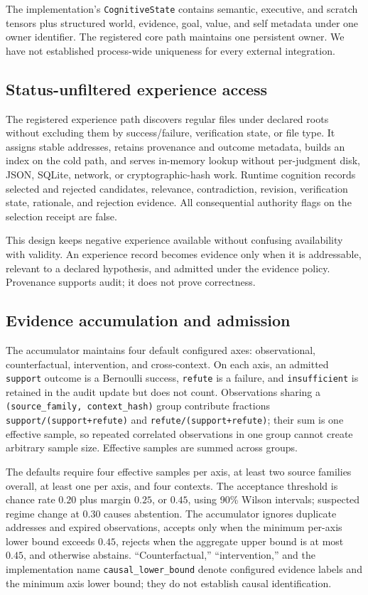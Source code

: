 \documentclass[10pt]{article}
\newcommand{\code}[1]{\texttt{#1}}
\begin{document}
The implementation's \code{CognitiveState} contains semantic, executive, and scratch tensors plus structured world, evidence, goal, value, and self metadata under one owner identifier. The registered core path maintains one persistent owner. We have not established process-wide uniqueness for every external integration.

\subsection{Status-unfiltered experience access}

The registered experience path discovers regular files under declared roots without excluding them by success/failure, verification state, or file type. It assigns stable addresses, retains provenance and outcome metadata, builds an index on the cold path, and serves in-memory lookup without per-judgment disk, JSON, SQLite, network, or cryptographic-hash work. Runtime cognition records selected and rejected candidates, relevance, contradiction, revision, verification state, rationale, and rejection evidence. All consequential authority flags on the selection receipt are false.

This design keeps negative experience available without confusing availability with validity. An experience record becomes evidence only when it is addressable, relevant to a declared hypothesis, and admitted under the evidence policy. Provenance supports audit; it does not prove correctness.

\subsection{Evidence accumulation and admission}

The accumulator maintains four default configured axes: observational, counterfactual, intervention, and cross-context. On each axis, an admitted \texttt{support} outcome is a Bernoulli success, \texttt{refute} is a failure, and \texttt{insufficient} is retained in the audit update but does not count. Observations sharing a \code{(source\_family, context\_hash)} group contribute fractions \code{support/(support+refute)} and \code{refute/(support+refute)}; their sum is one effective sample, so repeated correlated observations in one group cannot create arbitrary sample size. Effective samples are summed across groups.

The defaults require four effective samples per axis, at least two source families overall, at least one per axis, and four contexts. The acceptance threshold is chance rate $0.20$ plus margin $0.25$, or $0.45$, using 90\% Wilson intervals; suspected regime change at $0.30$ causes abstention. The accumulator ignores duplicate addresses and expired observations, accepts only when the minimum per-axis lower bound exceeds $0.45$, rejects when the aggregate upper bound is at most $0.45$, and otherwise abstains. ``Counterfactual,'' ``intervention,'' and the implementation name \code{causal\_lower\_bound} denote configured evidence labels and the minimum axis lower bound; they do not establish causal identification.
\end{document}
